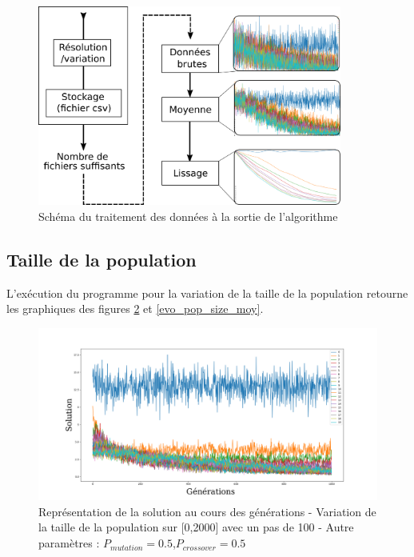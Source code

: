 \documentclass[12pt]{report}
\begin{document}
          \begin{figure}[!]
            \centering
            \includegraphics[width=10cm]{img/logigramme.png}
            \caption{Schéma du traitement des données à la sortie de l'algorithme}
            \label{logi}
          \end{figure}


      \subsection{Taille de la population}
        L'exécution du programme pour la variation de la taille de la population retourne les graphiques des figures \ref{evo_pop_size_brut} et \ref{evo_pop_size_moy}.

        \begin{figure}[h]
          \centering
          \includegraphics[width=18cm]{img/evo_pop_size_brut.png}
          \caption{Représentation de la solution au cours des générations - Variation de la taille de la population sur [0,2000] avec un pas de 100 - Autre paramètres : $P_{mutation} = 0.5$,$P_{crossover} = 0.5$}
          \label{evo_pop_size_brut}
        \end{figure}
\end{document}
